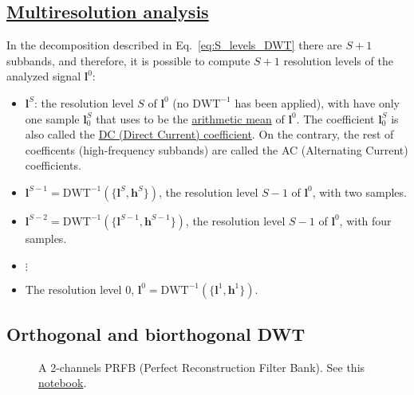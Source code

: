 \subsection{\href{https://en.wikipedia.org/wiki/Multiresolution_analysis}{Multiresolution analysis}}
In the decomposition described in Eq.~\ref{eq:S_levels_DWT} there are
$S+1$ subbands, and therefore, it is possible to compute $S+1$
resolution levels of the analyzed signal ${\mathbf l}^0$:
\begin{itemize}
\item  ${\mathbf l}^S$: the resolution level $S$ of ${\mathbf l}^0$ (no $\text{DWT}^{-1}$ has been
  applied), with have only one sample ${\mathbf l}^S_0$ that uses to be the
  \href{https://en.wikipedia.org/wiki/Arithmetic_mean}{arithmetic
    mean} of ${\mathbf l}^0$. The coefficient ${\mathbf l}^S_0$
  is also called the \href{https://en.wikipedia.org/wiki/DC_bias}{DC
    (Direct Current) coefficient}. On the contrary, the rest of
  coefficents (high-frequency subbands) are called the AC (Alternating
  Current) coefficients.
\item ${\mathbf l}^{S-1}=\text{DWT}^{-1}(\{{\mathbf l}^S, {\mathbf
  h}^S\})$, the resolution level $S-1$ of ${\mathbf l}^0$, with two
  samples.
\item ${\mathbf l}^{S-2}=\text{DWT}^{-1}(\{{\mathbf l}^{S-1}, {\mathbf
  h}^{S-1}\})$, the resolution level $S-1$ of ${\mathbf l}^0$, with
  four samples.
\item $\vdots$
\item The resolution level $0$, ${\mathbf
  l}^0=\text{DWT}^{-1}(\{{\mathbf l}^1, {\mathbf h}^1\})$.
\end{itemize}  

\subsection{Orthogonal and biorthogonal DWT}

\begin{figure}
  \centering
  \caption{A 2-channels PRFB (Perfect Reconstruction Filter Bank). See
    this
    \href{https://github.com/Sistemas-Multimedia/Sistemas-Multimedia.github.io/blob/master/study_guide/07-DWT/PRFB.ipynb}{notebook}.}
  \label{fig:PRFB}
\end{figure}

